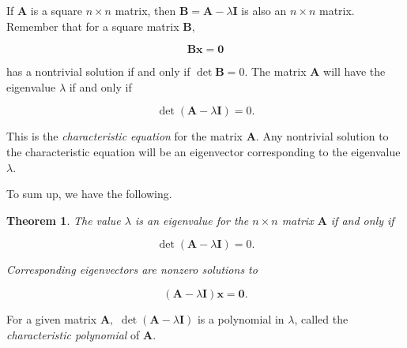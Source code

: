 \documentclass[
]{book}
\newtheorem{theorem}{Theorem}[chapter]
\theoremstyle{definition}
\theoremstyle{definition}
\theoremstyle{definition}
\theoremstyle{definition}
\theoremstyle{remark}
\begin{document}
If \(\mathbf{A}\) is a square \(n\times n\) matrix, then \(\mathbf{B}=\mathbf{A}-\lambda\mathbf{I}\) is also an \(n\times n\) matrix. Remember that for a square matrix \(\mathbf{B},\)

\[\mathbf{B}\mathbf{x}=\mathbf{0}\]

has a nontrivial solution if and only if \(\det \mathbf{B}=0.\) The matrix \(\mathbf{A}\) will have the eigenvalue \(\lambda\) if and only if

\[
\det(\mathbf{A}-\lambda\mathbf{I})=0. \label{eq:chareq}
\]

This is the \emph{characteristic equation} for the matrix \(\mathbf{A}.\) Any nontrivial solution to the characteristic equation will be an eigenvector corresponding to the eigenvalue \(\lambda.\)

To sum up, we have the following.

\begin{theorembox}

\begin{theorem}
The value \(\lambda\) is an eigenvalue for the \(n\times n\) matrix \(\mathbf{A}\) if and only if

\[\det(\mathbf{A}-\lambda\mathbf{I})=0.\]

Corresponding eigenvectors are nonzero solutions to

\[(\mathbf{A}-\lambda \mathbf{I})\mathbf{x}=\mathbf{0}.\]
\end{theorem}

\end{theorembox}

For a given matrix \(\mathbf{A},\) \(\det(\mathbf{A}-\lambda\mathbf{I})\) is a polynomial in \(\lambda\), called the \emph{characteristic polynomial} of \(\mathbf{A}.\)
\end{document}
